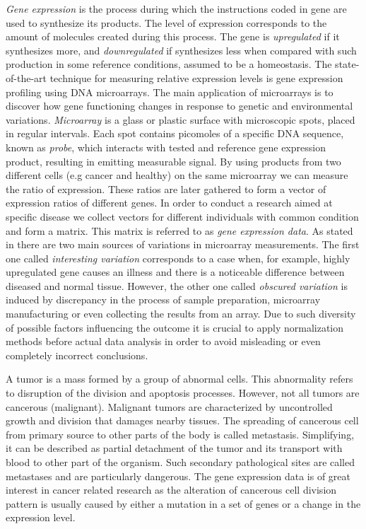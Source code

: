 \documentclass[shortabstract, english, mgr]{iithesis}
\begin{document}
\textit{Gene expression} is the process during which the instructions coded in gene are used to synthesize its products. The level of expression corresponds to the amount of molecules created during this process. The gene is \textit{upregulated} if it synthesizes more, and \textit{downregulated} if synthesizes less when compared with such production in some reference conditions, assumed to be a homeostasis. The state-of-the-art technique for measuring relative expression levels is gene expression profiling using DNA microarrays. The main application of microarrays is to discover how gene functioning changes in response to genetic and environmental variations. \textit{Microarray} is a glass or plastic surface with microscopic spots, placed in regular intervals. Each spot contains picomoles of a specific DNA sequence, known as \textit{probe}, which interacts with tested and reference gene expression product, resulting in emitting measurable signal. By using products from two different cells (e.g cancer and healthy) on the same microarray we can measure the ratio of expression. These ratios are later gathered to form a vector of expression ratios of different genes. In order to conduct a research aimed at specific disease we collect vectors for different individuals with common condition and form a matrix. This matrix is referred to as \textit{gene expression data}. As stated in \cite{preprocessing} there are two main sources of variations in microarray measurements. The first one called \textit{interesting variation} corresponds to a case when, for example, highly upregulated gene causes an illness and there is a noticeable difference between diseased and normal tissue. However, the other one called \textit{obscured variation} is induced by discrepancy in the process of sample preparation, microarray manufacturing or even collecting the results from an array. Due to such diversity of possible factors influencing the outcome it is crucial to apply normalization methods before actual data analysis in order to avoid misleading or even completely incorrect conclusions.

A tumor is a mass formed by a group of abnormal cells. This abnormality refers to disruption of the division and apoptosis processes. However, not all tumors are cancerous (malignant). Malignant tumors are characterized by uncontrolled growth and division that damages nearby tissues. The spreading of cancerous cell from primary source to other parts of the body is called metastasis. Simplifying, it can be described as partial detachment of the tumor and its transport with blood to other part of the organism. Such secondary pathological sites are called metastases and are particularly dangerous. The gene expression data is of great interest in cancer related research as the alteration of cancerous cell division pattern is usually caused by either a mutation in a set of genes or a change in the expression level.
\end{document}
